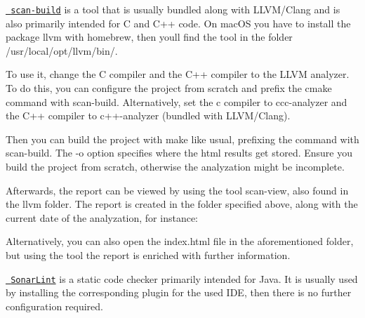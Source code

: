 \begin{DoxyCode}{0}
\end{DoxyCode}


\href{http://clang-analyzer.llvm.org/scan-build.html}{\texttt{ scan-\/build}} is a tool that is usually bundled along with L\+L\+V\+M/\+Clang and is also primarily intended for C and C++ code. On mac\+OS you have to install the package {\ttfamily llvm} with homebrew, then you\textquotesingle{}ll find the tool in the folder {\ttfamily /usr/local/opt/llvm/bin/}.

To use it, change the C compiler and the C++ compiler to the L\+L\+VM analyzer. To do this, you can configure the project from scratch and prefix the cmake command with {\ttfamily scan-\/build}. Alternatively, set the c compiler to {\ttfamily ccc-\/analyzer} and the C++ compiler to {\ttfamily c++-\/analyzer} (bundled with L\+L\+V\+M/\+Clang).

Then you can build the project with {\ttfamily make} like usual, prefixing the command with {\ttfamily scan-\/build}. The {\ttfamily -\/o} option specifies where the html results get stored. Ensure you build the project from scratch, otherwise the analyzation might be incomplete.


\begin{DoxyCode}{0}
\end{DoxyCode}


Afterwards, the report can be viewed by using the tool {\ttfamily scan-\/view}, also found in the llvm folder. The report is created in the folder specified above, along with the current date of the analyzation, for instance\+:


\begin{DoxyCode}{0}
\end{DoxyCode}


Alternatively, you can also open the {\ttfamily index.\+html} file in the aforementioned folder, but using the tool the report is enriched with further information.

\href{http://www.sonarlint.org/}{\texttt{ Sonar\+Lint}} is a static code checker primarily intended for Java. It is usually used by installing the corresponding plugin for the used I\+DE, then there is no further configuration required.

